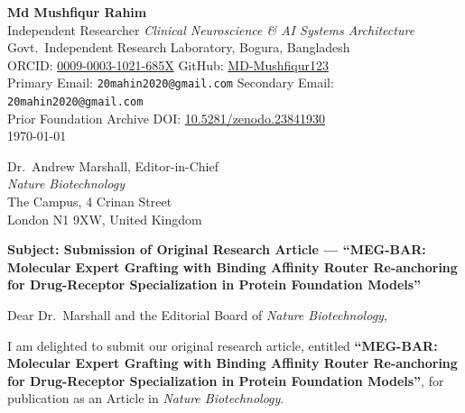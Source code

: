 \documentclass[11pt,a4paper]{article}
\begin{document}
\textbf{Md Mushfiqur Rahim}\\
Independent Researcher \quad \textit{Clinical Neuroscience \& AI Systems Architecture}\\
Govt.\ Independent Research Laboratory, Bogura, Bangladesh\\
ORCID: \href{https://orcid.org/0009-0003-1021-685X}{0009-0003-1021-685X} \quad GitHub: \href{https://github.com/MD-Mushfiqur123}{MD-Mushfiqur123}\\
Primary Email: \texttt{20mahin2020@gmail.com} \quad Secondary Email: \texttt{20mahin2020@gmail.com}\\
Prior Foundation Archive DOI: \href{https://doi.org/10.5281/zenodo.23841930}{10.5281/zenodo.23841930}\\

\today

Dr.\ Andrew Marshall, Editor-in-Chief\\
\textit{Nature Biotechnology}\\
The Campus, 4 Crinan Street\\
London N1 9XW, United Kingdom

\vspace{8pt}
\textbf{Subject: Submission of Original Research Article --- ``MEG-BAR: Molecular Expert Grafting with Binding Affinity Router Re-anchoring for Drug-Receptor Specialization in Protein Foundation Models''}
\vspace{4pt}

Dear Dr.\ Marshall and the Editorial Board of \textit{Nature Biotechnology},

I am delighted to submit our original research article, entitled \textbf{``MEG-BAR: Molecular Expert Grafting with Binding Affinity Router Re-anchoring for Drug-Receptor Specialization in Protein Foundation Models''}, for publication as an Article in \textit{Nature Biotechnology}.
\end{document}
